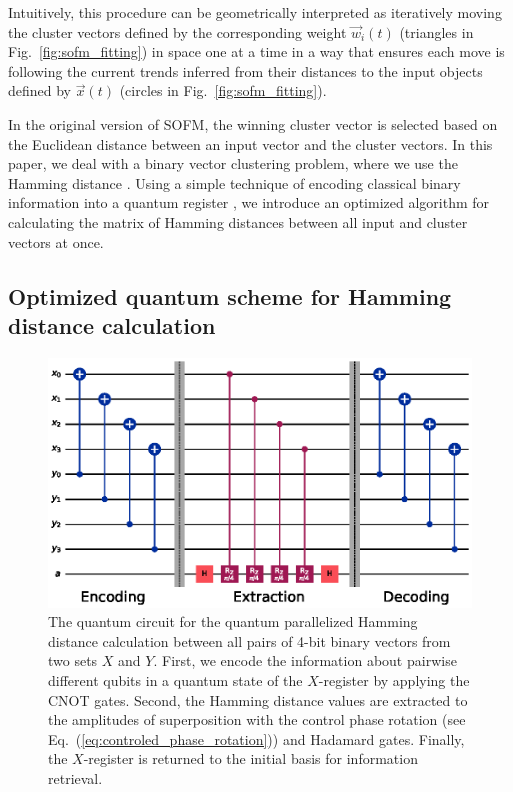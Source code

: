 \documentclass[pra,showkeys,twocolumn,showpacs,aps,10pt]{revtex4-2}
\begin{document}
Intuitively, this procedure can be geometrically interpreted as iteratively moving the cluster vectors defined by the corresponding weight $ \vec{w}_{i}(t) $ (triangles in Fig.~\ref{fig:sofm_fitting}) in space one at a time in a way that ensures each move is following the current trends inferred from their distances to the input objects defined by $\vec{x}(t)$ (circles in Fig.~\ref{fig:sofm_fitting}).

In the original version of SOFM, the winning cluster vector is selected based on the Euclidean distance between an input vector and the cluster vectors. In this paper, we deal with a binary vector clustering problem, where we use the Hamming distance \cite{appiah2009, santana2017}.
Using a simple technique of encoding classical binary information into a quantum register \cite{trugenberger2001},
we introduce an optimized algorithm for calculating the matrix of Hamming distances between all input and cluster vectors at once.




















\subsection{Optimized quantum scheme for Hamming distance calculation}
\label{subsec:qcircuit}


\begin{figure}[t]
  \includegraphics[width=1.85\columnwidth]{qcircuit.eps}
  \caption{%
    The quantum circuit for the quantum parallelized Hamming distance calculation between all pairs of 4-bit binary vectors from two sets ${X}$ and ${Y}$.
    First, we encode the information about pairwise different qubits in a quantum state of the $X$-register by applying the CNOT gates.
    Second, the Hamming distance values are extracted to the amplitudes of superposition with the control phase rotation (see Eq.~(\ref{eq:controled_phase_rotation})) and Hadamard gates.
    Finally, the $X$-register is returned to the initial basis for information retrieval.   }
  \label{fig:qcircuit}
\end{figure}
\end{document}

